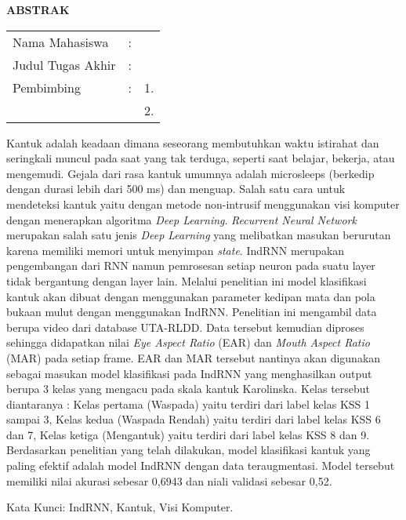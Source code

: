 \begin{center}
  \large\textbf{ABSTRAK}
\end{center}


\vspace{2ex}

\begingroup
\setlength{\tabcolsep}{0pt}

\noindent
\begin{tabularx}{\textwidth}{l >{\centering}m{2em} X}
  Nama Mahasiswa    & : & \name{}         \\

  Judul Tugas Akhir & : & \tatitle{}      \\

  Pembimbing        & : & 1. \advisor{}   \\
                    &   & 2. \coadvisor{} \\
\end{tabularx}
\endgroup

Kantuk adalah keadaan dimana seseorang membutuhkan waktu istirahat dan seringkali muncul pada 
saat yang tak terduga, seperti saat belajar, bekerja, atau mengemudi. Gejala dari 
rasa kantuk umumnya adalah microsleeps (berkedip dengan durasi lebih dari 500 ms) dan
menguap. Salah satu cara untuk mendeteksi kantuk yaitu dengan metode non-intrusif
menggunakan visi komputer dengan menerapkan algoritma \emph{Deep Learning}. \emph{Recurrent Neural Network} merupakan
salah satu jenis \emph{Deep Learning} yang melibatkan masukan berurutan karena memiliki memori
untuk menyimpan \emph{state}. IndRNN merupakan pengembangan dari RNN namun pemrosesan setiap
neuron pada suatu layer tidak bergantung dengan layer lain. Melalui penelitian ini
model klasifikasi kantuk akan dibuat dengan menggunakan parameter kedipan mata dan
pola bukaan mulut dengan menggunakan IndRNN. Penelitian ini mengambil data berupa
video dari database UTA-RLDD. Data tersebut kemudian diproses sehingga
didapatkan nilai \emph{Eye Aspect Ratio} (EAR) dan \emph{Mouth Aspect Ratio} (MAR) pada
setiap frame. EAR dan MAR tersebut nantinya akan digunakan sebagai masukan model
klasifikasi pada IndRNN yang menghasilkan output berupa 3 kelas yang mengacu pada skala
kantuk Karolinska. Kelas tersebut diantaranya : Kelas pertama (Waspada) yaitu
terdiri dari label kelas KSS 1 sampai 3, Kelas kedua (Waspada Rendah) yaitu terdiri dari
label kelas KSS 6 dan 7, Kelas ketiga (Mengantuk) yaitu terdiri dari label kelas
KSS 8 dan 9. Berdasarkan penelitian yang telah dilakukan, model klasifikasi kantuk yang 
paling efektif adalah model IndRNN dengan data teraugmentasi. Model tersebut memiliki 
nilai akurasi sebesar 0,6943 dan niali validasi sebesar 0,52.

Kata Kunci: IndRNN, Kantuk, Visi Komputer.
